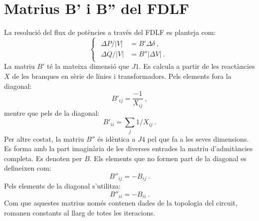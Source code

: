 \section{Matrius B' i B'' del FDLF}
La resolució del flux de potències a través del FDLF es planteja com:
\begin{equation}
    \begin{cases}
    \begin{split}
        \Delta P/|V|&=B'\Delta \delta\ ,\\
        \Delta Q/|V|&=B''|\Delta V|\ .
    \end{split}
\end{cases}
    \label{eq:annex7}
\end{equation}
La matriu $B'$ té la mateixa dimensió que $J1$. Es calcula a partir de les reactàncies $X$ de les branques en sèrie de línies i transformadors. Pels elements fora la diagonal:
\begin{equation}
        B'_{ij}=\frac{-1}{X_{ij}}\ ,
    \label{eq:annex8}
\end{equation}
mentre que pels de la diagonal:
\begin{equation}
    B'_{ii}=\sum_j 1/X_{ij}\ .
\label{eq:annex8x}
\end{equation}
Per altre costat, la matriu $B''$ és idèntica a $J4$ pel que fa a les seves dimensions. Es forma amb la part imaginària de les diverses entrades la matriu d'admitàncies completa. Es denoten per $B$. Els elements que no formen part de la diagonal es defineixen com:
\begin{equation}
    B''_{ij}=-B_{ij}\ .
\label{eq:annex9}
\end{equation}
Pels elements de la diagonal s'utilitza:
\begin{equation}
    B''_{ii}=-B_{ii}\ .
\label{eq:annex10}
\end{equation}
Com que aquestes matrius només contenen dades de la topologia del circuit, romanen constants al llarg de totes les iteracions.
